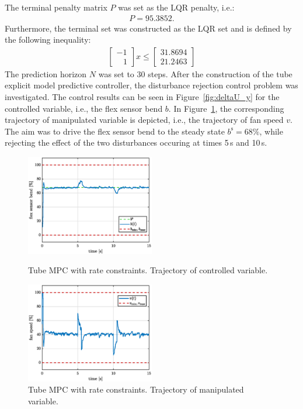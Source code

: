 \documentclass[letterpaper, 10 pt, conference]{ieeeconf}
\begin{document}
The terminal penalty matrix $P$ was set as the LQR penalty, i.e.:
\begin{eqnarray}
	\label{eq:setup_P}
	P = 95.3852.
\end{eqnarray}
Furthermore, the terminal set was constructed as the LQR set and is defined by the following inequality:
\begin{eqnarray}
	\label{eq:setup_terminal_set}
	\begin{bmatrix}
	-1 \\	
	\,\,\,\,\, 1
	\end{bmatrix} x \le 
	\begin{bmatrix}
		31.8694\\	
		21.2463
	\end{bmatrix}
\end{eqnarray}
The prediction horizon $N$ was set to 30 steps. After the construction of the tube explicit model predictive controller, the disturbance rejection control problem was investigated. The control results can be seen in Figure~\ref{fig:deltaU_y} for the controlled variable, i.e., the flex sensor bend $b$. In Figure~\ref{fig:deltaU_u}, the corresponding trajectory of manipulated variable is depicted, i.e., the trajectory of fan speed $v$. The aim was to drive the flex sensor bend to the steady state $ b^\mathrm{s} = 68\%$, while rejecting the effect of the two disturbances occuring at times 5\,s and 10\,s. 

\begin{figure}
	\begin{center}
		\includegraphics[width=0.5\textwidth]{images/deltaU_b_new.eps}
		\caption{Tube MPC with rate constraints. Trajectory of controlled variable.}
		\label{fig:deltaU_y}
	\end{center}
%
	\begin{center}
		\includegraphics[width=0.5\textwidth]{images/deltaU_v_new.eps}
		\caption{Tube MPC with rate constraints. Trajectory of manipulated variable.}
		\label{fig:deltaU_u}
	\end{center}
\end{figure}
\end{document}
